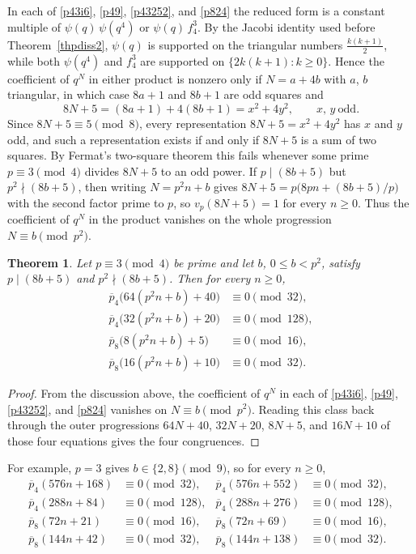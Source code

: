 \documentclass[11pt, reqno]{amsart}
\newtheorem{theorem}{Theorem}[section]
\numberwithin{equation}{section}
\begin{document}
	In each of \eqref{p43i6}, \eqref{p49}, \eqref{p43252}, and \eqref{p824} the
	reduced form is a constant multiple of $\psi(q)\,\psi(q^4)$ or
	$\psi(q)\,f_4^3$. By the Jacobi identity used before Theorem~\ref{thpdiss2},
	$\psi(q)$ is supported on the triangular numbers $\tfrac{k(k+1)}{2}$, while
	both $\psi(q^4)$ and $f_4^3$ are supported on $\{2k(k+1):k\ge0\}$. Hence the
	coefficient of $q^N$ in either product is nonzero only if $N=a+4b$ with $a$,
	$b$ triangular, in which case $8a+1$ and $8b+1$ are odd squares and
	\begin{equation}
		8N+5=(8a+1)+4(8b+1)=x^2+4y^2,\qquad x,\,y\ \text{odd}.\label{tform1}
	\end{equation}
	Since $8N+5\equiv5\pmod8$, every representation $8N+5=x^2+4y^2$ has $x$ and
	$y$ odd, and such a representation exists if and only if $8N+5$ is a sum of
	two squares. By Fermat's two-square theorem this fails whenever some prime
	$p\equiv3\pmod4$ divides $8N+5$ to an odd power. If $p\mid(8b+5)$ but
	$p^2\nmid(8b+5)$, then writing $N=p^2n+b$ gives
	$8N+5=p\bigl(8pn+(8b+5)/p\bigr)$ with the second factor prime to $p$, so
	$v_p(8N+5)=1$ for every $n\ge0$. Thus the coefficient of $q^N$ in the product
	vanishes on the whole progression $N\equiv b\pmod{p^2}$.
	
	\begin{theorem}\label{thprodA}
		Let $p\equiv3\pmod4$ be prime and let $b$, $0\le b<p^2$, satisfy
		$p\mid(8b+5)$ and $p^2\nmid(8b+5)$. Then for every $n\ge0$,
		\begin{align}
			\overline{p}_{4}\bigl(64(p^2n+b)+40\bigr)&\equiv0\pmod{32},\\
			\overline{p}_{4}\bigl(32(p^2n+b)+20\bigr)&\equiv0\pmod{128},\\
			\overline{p}_{8}\bigl(8(p^2n+b)+5\bigr)&\equiv0\pmod{16},\\
			\overline{p}_{8}\bigl(16(p^2n+b)+10\bigr)&\equiv0\pmod{32}.
		\end{align}
	\end{theorem}
	\begin{proof}
		From the discussion above, the coefficient of $q^N$ in each of \eqref{p43i6},
		\eqref{p49}, \eqref{p43252}, and \eqref{p824} vanishes on
		$N\equiv b\pmod{p^2}$. Reading this class back through the outer progressions
		$64N+40$, $32N+20$, $8N+5$, and $16N+10$ of those four equations gives the
		four congruences.
	\end{proof}
	For example, $p=3$ gives $b\in\{2,8\}\pmod9$, so for every $n\ge0$,
	\begin{align}
		\overline{p}_{4}(576n+168)&\equiv0\pmod{32}, &
		\overline{p}_{4}(576n+552)&\equiv0\pmod{32},\\
		\overline{p}_{4}(288n+84)&\equiv0\pmod{128}, &
		\overline{p}_{4}(288n+276)&\equiv0\pmod{128},\\
		\overline{p}_{8}(72n+21)&\equiv0\pmod{16}, &
		\overline{p}_{8}(72n+69)&\equiv0\pmod{16},\\
		\overline{p}_{8}(144n+42)&\equiv0\pmod{32}, &
		\overline{p}_{8}(144n+138)&\equiv0\pmod{32}.
	\end{align}
	
\end{document}
